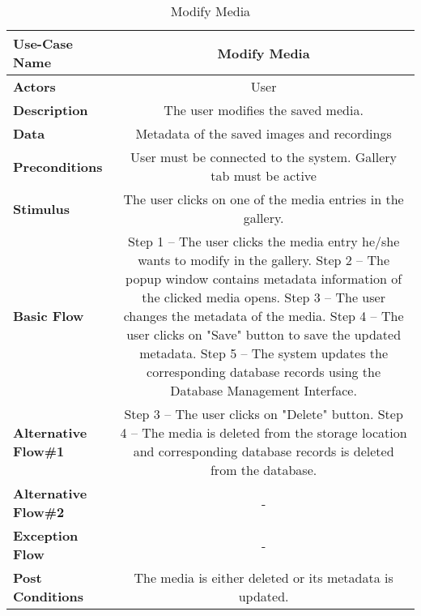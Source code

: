 \begin{table}[H]
     \centering
     \begin{tabular}{|l|C|}
         \hline
          \textbf{Use-Case Name} & Modify Media \\
         \hline
          \textbf{Actors} & User \\ 
         \hline
          \textbf{Description} & The user modifies the saved media. \\ 
         \hline
          \textbf{Data} & Metadata of the saved images and recordings\\ 
         \hline
          \textbf{Preconditions} & 
          User must be connected to the system. \newline
          Gallery tab must be active \\
         \hline
          \textbf{Stimulus} & The user clicks on one of the media entries in the gallery. \\ 
         \hline
          \textbf{Basic Flow} & 
          Step 1 --  The user clicks the media entry he/she wants to modify in the gallery. \newline
          Step 2 -- The popup window contains metadata information of the clicked media opens. \newline
          Step 3 -- The user changes the metadata of the media. \newline
          Step 4 -- The user clicks on "Save" button to save the updated metadata. \newline
          Step 5 -- The system updates the corresponding database records using the Database Management Interface. \\
         \hline
          \textbf{Alternative Flow\#1} &            
          Step 3 -- The user clicks on "Delete" button. \newline
          Step 4 -- The media is deleted from the storage location and corresponding database records is deleted from the database. \\
         \hline
          \textbf{Alternative Flow\#2} & -\\
         \hline
          \textbf{Exception Flow} & - \\
         \hline
          \textbf{Post Conditions} & The media is either deleted or its metadata is updated. \\ 
         \hline
     \end{tabular}
     \caption{Modify Media}
     \label{tab:modify_media}
 \end{table}